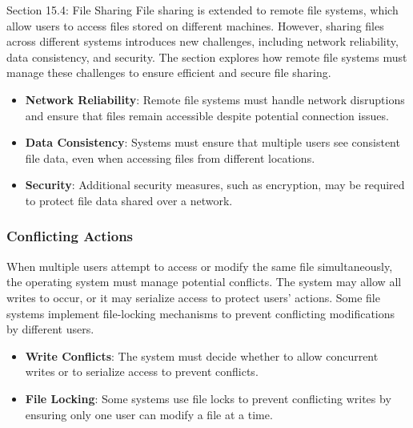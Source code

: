 \begin{notes}{Section 15.4: File Sharing}
    File sharing is extended to remote file systems, which allow users to access files stored on different machines. However, sharing files across different systems introduces new challenges, including 
    network reliability, data consistency, and security. The section explores how remote file systems must manage these challenges to ensure efficient and secure file sharing.
    
    \begin{highlight}
    
        \begin{itemize}
            \item \textbf{Network Reliability}: Remote file systems must handle network disruptions and ensure that files remain accessible despite potential connection issues.
            \item \textbf{Data Consistency}: Systems must ensure that multiple users see consistent file data, even when accessing files from different locations.
            \item \textbf{Security}: Additional security measures, such as encryption, may be required to protect file data shared over a network.
        \end{itemize}
    
    \end{highlight}
    
    \subsubsection*{Conflicting Actions}
    
    When multiple users attempt to access or modify the same file simultaneously, the operating system must manage potential conflicts. The system may allow all writes to occur, or it may serialize 
    access to protect users' actions. Some file systems implement file-locking mechanisms to prevent conflicting modifications by different users.
    
    \begin{highlight}
    
        \begin{itemize}
            \item \textbf{Write Conflicts}: The system must decide whether to allow concurrent writes or to serialize access to prevent conflicts.
            \item \textbf{File Locking}: Some systems use file locks to prevent conflicting writes by ensuring only one user can modify a file at a time.
        \end{itemize}
    

\end{highlight}
\end{notes}
